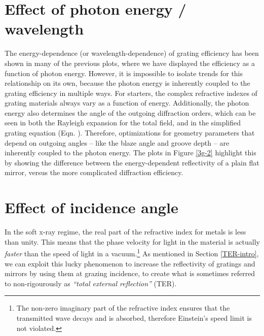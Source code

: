 \section{Effect of photon energy / wavelength}
The energy-dependence (or wavelength-dependence) of grating efficiency has been shown in many of the previous plots, where we have displayed the efficiency as a function of photon energy.  However, it is impossible to isolate trends for this relationship on its own, because the photon energy is inherently coupled to the grating efficiency in multiple ways.  For starters, the complex refractive indexes of grating materials always vary as a function of energy.  Additionally, the photon energy also determines the angle of the outgoing diffraction orders, which can be seen in both the Rayleigh expansion for the total field, and in the simplified grating equation (Eqn. ).  Therefore, optimizations for geometry parameters that depend on outgoing angles -- like the blaze angle and groove depth -- are inherently coupled to the photon energy.  The plots in Figure \ref{3g-2} highlight this by showing the difference between the energy-dependent reflectivity of a plain flat mirror, versus the more complicated diffraction efficiency.

\section{Effect of incidence angle}
\label{TER}
In the soft x-ray regime, the real part of the refractive index for metals is less than unity.  This means that the phase velocity for light in the material is actually \emph{faster} than the speed of light in a vacuum.\footnote{The non-zero imaginary part of the refractive index ensures that the transmitted wave decays and is absorbed, therefore Einstein's speed limit is not violated.}  As mentioned in Section \ref{TER-intro}, we can exploit this lucky phenomenon to increase the reflectivity of gratings and mirrors by using them at grazing incidence, to create what is sometimes referred to non-rigourously as \emph{``total external reflection''} (TER).

